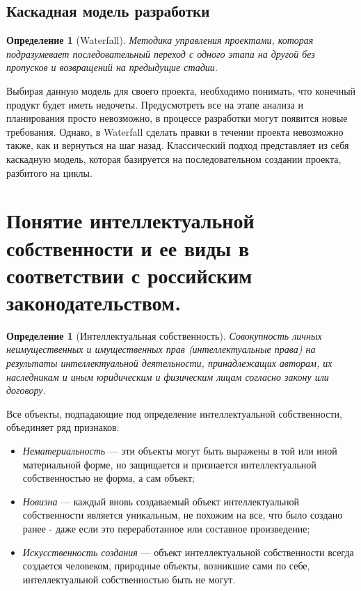 \documentclass[11pt]{article}
\theoremstyle{plain} %
\newtheorem{proposition}[theorem]{Определение}
\theoremstyle{definition} %
\theoremstyle{remark} %
\begin{document}
\subsection{Каскадная модель разработки}

\begin{proposition}[Waterfall]
	Методика управления проектами, которая подразумевает последовательный переход с одного этапа на другой без пропусков и возвращений на предыдущие стадии.
\end{proposition}

Выбирая данную модель для своего проекта, необходимо понимать, что конечный продукт будет иметь недочеты. Предусмотреть все на этапе анализа и планирования просто невозможно, в процессе разработки могут появится новые требования. Однако, в Waterfall сделать правки в течении проекта невозможно также, как и вернуться на шаг назад. Классический подход представляет из себя каскадную модель, которая базируется на последовательном создании проекта, разбитого на циклы.

\newpage

\section{Понятие интеллектуальной собственности и ее виды в соответствии с российским законодательством.}\label{erste}

\begin{proposition}[Интеллектуальная собственность]
	Совокупность личных неимущественных и имущественных прав (интеллектуальные права) на результаты интеллектуальной деятельности, принадлежащих авторам, их наследникам и иным юридическим и физическим лицам согласно закону или договору.
\end{proposition}

Все объекты, подпадающие под определение интеллектуальной собственности, объединяет ряд признаков:
\begin{itemize}
	\item \textit{Нематериальность} --- эти объекты могут быть выражены в той или иной материальной форме, но защищается и признается интеллектуальной собственностью не форма, а сам объект;
	\item \textit{Новизна} --- каждый вновь создаваемый объект интеллектуальной собственности является уникальным, не похожим на все, что было создано ранее - даже если это переработанное или составное произведение;
	\item \textit{Искусственность создания} --- объект интеллектуальной собственности всегда создается человеком, природные объекты, возникшие сами по себе, интеллектуальной собственностью быть не могут.
\end{itemize}
\end{document}
